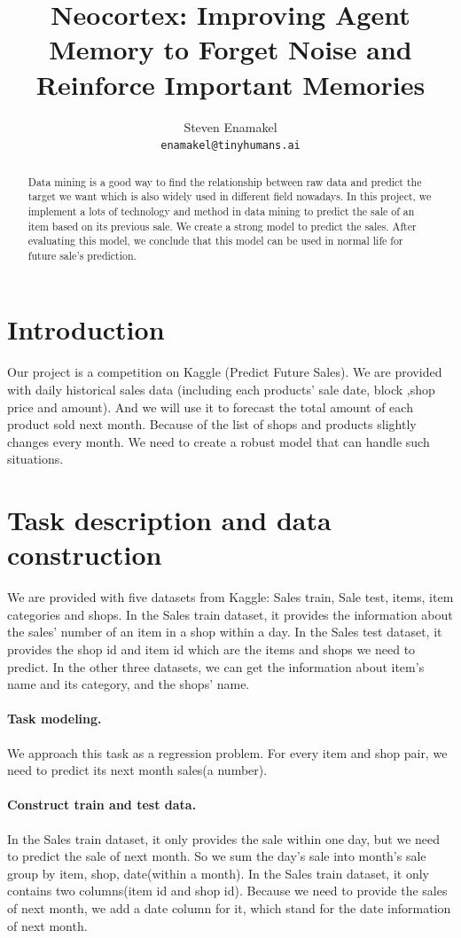 \documentclass{article}
\title{Neocortex: Improving Agent Memory to Forget Noise and Reinforce Important Memories}
\author{
 Steven Enamakel \\
  \texttt{enamakel@tinyhumans.ai} \\
}
\begin{document}
\maketitle
\begin{abstract}
Data mining is a good way to find the relationship between raw data and predict the target we want which is also widely used in different field nowadays. In this project, we implement a lots of technology and method in data mining to predict the sale of an item based on its previous sale. We create a strong model to predict the sales. After evaluating this model, we conclude that this model can be used in normal life for future sale’s prediction.
\end{abstract}




\section{Introduction}
Our project is a competition on Kaggle (Predict Future Sales). We are provided with daily historical sales data (including each products’ sale date, block ,shop price and amount). And we will use it to forecast the total amount of each product sold next month. Because of the list of shops and products slightly changes every month. We need to create a robust model that can handle such situations.


\section{Task description and data construction}
\label{sec:headings}
We are provided with five datasets from Kaggle: Sales train, Sale test, items, item categories and shops. In the Sales train dataset, it provides the information about the sales’ number of an item in a shop within a day. In the Sales test dataset, it provides the shop id and item id which are the items and shops we need to predict. In the other three datasets, we can get the information about item’s name and its category, and the shops’ name.
\paragraph{Task modeling.}
We approach this task as a regression problem. For every item and shop pair, we need to predict its next month sales(a number).
\paragraph{Construct train and test data.}
In the Sales train dataset, it only provides the sale within one day, but we need to predict the sale of next month. So we sum the day's sale into month's sale group by item, shop, date(within a month).
In the Sales train dataset, it only contains two columns(item id and shop id). Because we need to provide the sales of next month, we add a date column for it, which stand for the date information of next month.
\end{document}
